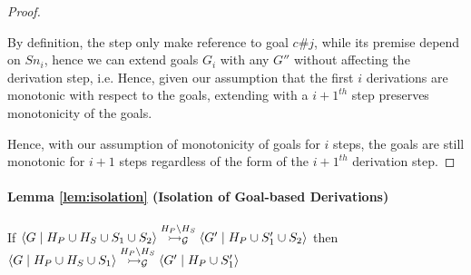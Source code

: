 \documentclass{tlp}
\begin{document}
\begin{proof}
\begin{itemize}
	        By definition, the  step only make reference to goal $c\#j$, while its 
	        premise depend on $Sn_i$, hence we can extend goals $G_i$ with any $G''$ without
	        affecting the derivation step, i.e.
	           \goaltrans 
	        \eda
	        Hence, given our assumption that the first $i$ derivations are monotonic with respect
          to the goals,	extending with a $i+1^{th}$  step preserves monotonicity
          of the goals. 
  \end{itemize}
  Hence, with our assumption of monotonicity of goals for $i$ steps, the goals are still monotonic for
	$i+1$ steps regardless of the form of the $i+1^{th}$ derivation step.
\end{proof}

\paragraph{Lemma \ref{lem:isolation} (Isolation of Goal-based Derivations)} 

If $\langle G\mid H_P \cup H_S \cup S_1 \cup S_2 \rangle 
    \stackrel{H_P \backslash H_S}{\rightarrowtail_{\cal G}} 
    \langle G'\mid H_P \cup S_1' \cup S_2 \rangle$ 
then $\langle G\mid H_P \cup H_S \cup S_1 \rangle 
      \stackrel{H_P \backslash H_S}{\rightarrowtail_{\cal G}} 
      \langle G'\mid H_P \cup S_1' \rangle$
\end{document}
